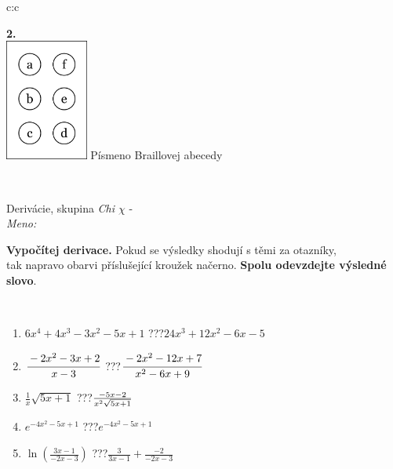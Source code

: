 \documentclass[10pt]{report}
\begin{document}
\begin{tabular}{c:c}
\begin{minipage}[c][104.5mm][t]{0.5\linewidth}
\begin{center}
\begin{minipage}{0.20\linewidth}
\begin{center}
{\Huge\bfseries 2.} \\[2mm]
\includegraphics[height=40mm]{../images/braille.png}
{\small Písmeno Braillovej abecedy}
\end{center}
\end{minipage}
\end{center}
\end{minipage}
\\ \hdashline
\begin{minipage}[c][104.5mm][t]{0.5\linewidth}
\begin{center}
\vspace{7mm}
{\huge Derivácie, skupina \textit{Chi $\chi$} -}\\[5mm]
\textit{Meno:}\phantom{xxxxxxxxxxxxxxxxxxxxxxxxxxxxxxxxxxxxxxxxxxxxxxxxxxxxxxxxxxxxxxxxx}\\[5mm]
\begin{minipage}{0.95\linewidth}
\begin{center}
\textbf{Vypočítej derivace.} Pokud se výsledky shodují s těmi za otazníky,\\tak napravo obarvi příslušející kroužek načerno. \textbf{Spolu odevzdejte výsledné slovo}.
\end{center}
\end{minipage}
\\[1mm]
\begin{minipage}{0.79\linewidth}
\begin{center}
\begin{varwidth}{\linewidth}
\begin{enumerate}
\normalsize
\item $6x^4+4x^3-3x^2-5x+1$\quad \dotfill\; ???\;\dotfill \quad $24x^3+12x^2-6x-5$
\item $\cfrac{-2x^2-3x+2}{x-3}$\quad \dotfill\; ???\;\dotfill \quad $\cfrac{-2x^2-12x+7}{x^2-6x+9}$
\item $\frac{1}{x}\sqrt{5x+1}$\quad \dotfill\; ???\;\dotfill \quad $\frac{-5x-2}{x^2 \sqrt{\smash[b]{5x+1}}}$
\item $e^{-4x^2-5x+1}$\quad \dotfill\; ???\;\dotfill \quad $e^{-4x^2-5x+1}$
\item $\ln{\left(\frac{3x-1}{-2x-3}\right)}$\quad \dotfill\; ???\;\dotfill \quad $\frac{3}{3x-1}+\frac{-2}{-2x-3}$

\end{enumerate}
\end{varwidth}
\end{center}
\end{minipage}
\end{center}
\end{minipage}
\end{tabular}
\end{document}
